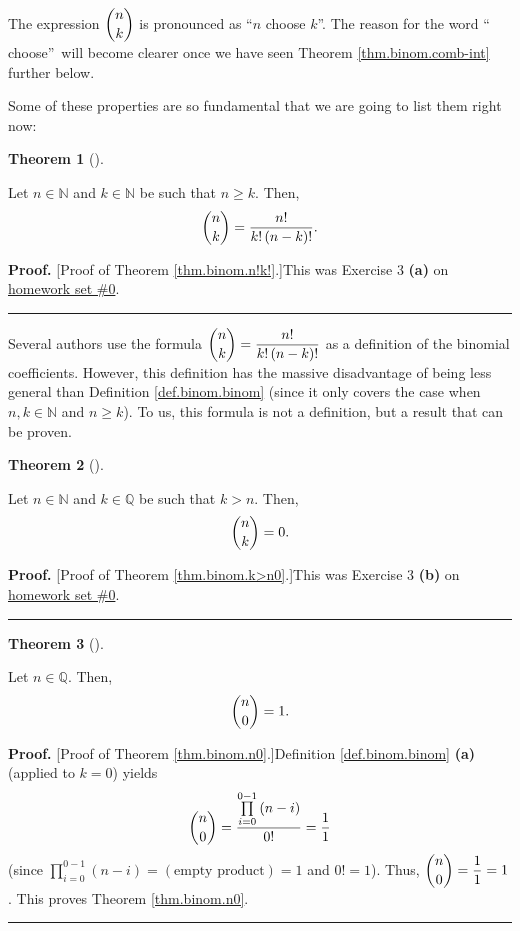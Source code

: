 \documentclass[numbers=enddot,12pt,final,onecolumn,notitlepage]{scrartcl}%
\numberwithin{exer}{subsection}
\theoremstyle{definition}
\newtheorem{theo}{Theorem}[subsection]
\newenvironment{theorem}[1][]
{\begin{theo}[#1]\begin{leftbar}}
{\end{leftbar}\end{theo}}
\newenvironment{proof}[1][Proof]{\noindent\textbf{#1.} }{\ \rule{0.5em}{0.5em}}
\let\prodnonlimits\prod
\renewcommand{\prod}{\prodnonlimits\limits}
\begin{document}
The expression $\dbinom{n}{k}$ is pronounced as \textquotedblleft$n$ choose
$k$\textquotedblright. The reason for the word \textquotedblleft
choose\textquotedblright\ will become clearer once we have seen Theorem
\ref{thm.binom.comb-int} further below.

Some of these properties are so fundamental that we are going to list them
right now:

\begin{theorem}
\label{thm.binom.n!k!}Let $n\in\mathbb{N}$ and $k\in\mathbb{N}$ be such that
$n\geq k$. Then,%
\[
\dbinom{n}{k}=\dfrac{n!}{k!\left(  n-k\right)  !}.
\]

\end{theorem}

\begin{proof}
[Proof of Theorem \ref{thm.binom.n!k!}.]This was Exercise 3 \textbf{(a)} on
\href{http://www-users.math.umn.edu/~dgrinber/19s/hw0s.pdf}{homework set \#0}.
\end{proof}

Several authors use the formula $\dbinom{n}{k}=\dfrac{n!}{k!\left(
n-k\right)  !}$ as a definition of the binomial coefficients. However, this
definition has the massive disadvantage of being less general than Definition
\ref{def.binom.binom} (since it only covers the case when $n,k\in\mathbb{N}$
and $n\geq k$). To us, this formula is not a definition, but a result that can
be proven.

\begin{theorem}
\label{thm.binom.k>n0}Let $n\in\mathbb{N}$ and $k\in\mathbb{Q}$ be such that
$k>n$. Then,
\[
\dbinom{n}{k}=0.
\]

\end{theorem}

\begin{proof}
[Proof of Theorem \ref{thm.binom.k>n0}.]This was Exercise 3 \textbf{(b)} on
\href{http://www-users.math.umn.edu/~dgrinber/19s/hw0s.pdf}{homework set \#0}.
\end{proof}

\begin{theorem}
\label{thm.binom.n0}Let $n\in\mathbb{Q}$. Then,%
\[
\dbinom{n}{0}=1.
\]

\end{theorem}

\begin{proof}
[Proof of Theorem \ref{thm.binom.n0}.]Definition \ref{def.binom.binom}
\textbf{(a)} (applied to $k=0$) yields%
\[
\dbinom{n}{0}=\dfrac{\prod_{i=0}^{0-1}\left(  n-i\right)  }{0!}=\dfrac{1}{1}%
\]
(since $\prod_{i=0}^{0-1}\left(  n-i\right)  =\left(  \text{empty
product}\right)  =1$ and $0!=1$). Thus, $\dbinom{n}{0}=\dfrac{1}{1}=1$. This
proves Theorem \ref{thm.binom.n0}.
\end{proof}
\end{document}
